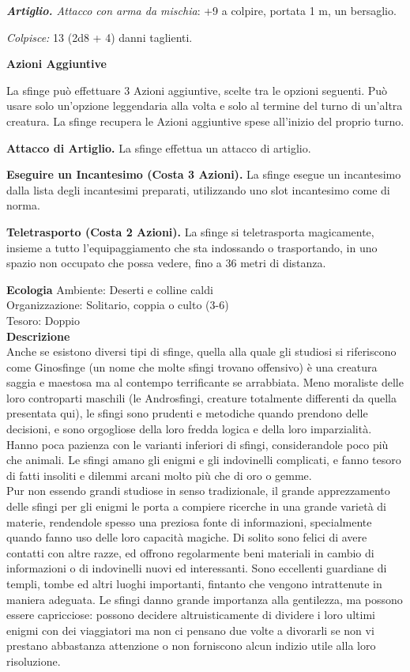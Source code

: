 \begin{multicols}{2}
\emph{\textbf{Artiglio.} Attacco con arma da mischia}: +9 a colpire, portata 1 m, un bersaglio.

\emph{Colpisce:} 13 (2d8 + 4) danni taglienti.

\textbf{Azioni Aggiuntive}

La sfinge può effettuare 3 Azioni aggiuntive, scelte tra le opzioni seguenti. Può usare solo un'opzione leggendaria alla volta e solo al termine del turno di un'altra creatura. La sfinge recupera le Azioni aggiuntive spese all'inizio del proprio turno.

\textbf{Attacco di Artiglio.} La sfinge effettua un attacco di artiglio. 

\textbf{Eseguire un Incantesimo (Costa 3 Azioni).} La sfinge esegue un incantesimo dalla lista degli incantesimi preparati, utilizzando uno slot incantesimo come di norma.

\textbf{Teletrasporto (Costa 2 Azioni).} La sfinge si teletrasporta magicamente, insieme a tutto l'equipaggiamento che sta indossando o trasportando, in uno spazio non occupato che possa vedere, fino a 36 metri di distanza.

\textbf{Ecologia}
Ambiente: Deserti e colline caldi\\
Organizzazione: Solitario, coppia o culto (3-6)\\
Tesoro: Doppio\\
\textbf{Descrizione}\\
Anche se esistono diversi tipi di sfinge, quella alla quale gli studiosi si riferiscono come Ginosfinge (un nome che molte sfingi trovano offensivo) è una creatura saggia e maestosa ma al contempo terrificante se arrabbiata. Meno moraliste delle loro controparti maschili (le Androsfingi, creature totalmente differenti da quella presentata qui), le sfingi sono prudenti e metodiche quando prendono delle decisioni, e sono orgogliose della loro fredda logica e della loro imparzialità. Hanno poca pazienza con le varianti inferiori di sfingi, considerandole poco più che animali. Le sfingi amano gli enigmi e gli indovinelli complicati, e fanno tesoro di fatti insoliti e dilemmi arcani molto più che di oro o gemme.\\

Pur non essendo grandi studiose in senso tradizionale, il grande apprezzamento delle sfingi per gli enigmi le porta a compiere ricerche in una grande varietà di materie, rendendole spesso una preziosa fonte di informazioni, specialmente quando fanno uso delle loro capacità magiche. Di solito sono felici di avere contatti con altre razze, ed offrono regolarmente beni materiali in cambio di informazioni o di indovinelli nuovi ed interessanti. Sono eccellenti guardiane di templi, tombe ed altri luoghi importanti, fintanto che vengono intrattenute in maniera adeguata. Le sfingi danno grande importanza alla gentilezza, ma possono essere capricciose: possono decidere altruisticamente di dividere i loro ultimi enigmi con dei viaggiatori ma non ci pensano due volte a divorarli se non vi prestano abbastanza attenzione o non forniscono alcun indizio utile alla loro risoluzione.\\


\end{multicols}
